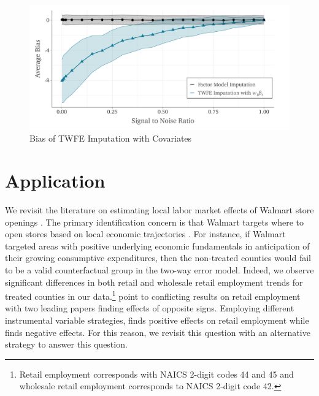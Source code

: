 \documentclass[12pt]{article}
\begin{document}
\begin{figure}
  \begin{adjustbox}{width=.8\textwidth, center}
    \includegraphics{simulation-bias_signal_to_noise.pdf}
  \end{adjustbox}
  \caption{Bias of TWFE Imputation with Covariates}\label{fig:noisy_w}
  
\end{figure}


\section{Application}\label{sec:application}

We revisit the literature on estimating local labor market effects of Walmart store openings \citep{basker2005job, neumark2008effects, volpe2022economic}. The primary identification concern is that Walmart targets where to open stores based on local economic trajectories \citep{neumark2008effects}. For instance, if Walmart targeted areas with positive underlying economic fundamentals in anticipation of their growing consumptive expenditures, then the non-treated counties would fail to be a valid counterfactual group in the two-way error model. Indeed, we observe significant differences in both retail and wholesale retail employment trends for treated counties in our data.\footnote{Retail employment corresponds with NAICS 2-digit codes 44 and 45 and wholesale retail employment corresponds to NAICS 2-digit code 42.} \citet{volpe2022economic} point to conflicting results on retail employment with two leading papers finding effects of opposite signs. Employing different instrumental variable strategies, \citet{basker2005job} finds positive effects on retail employment while \citet{neumark2008effects} finds negative effects. For this reason, we revisit this question with an alternative strategy to answer this question. 
\end{document}
